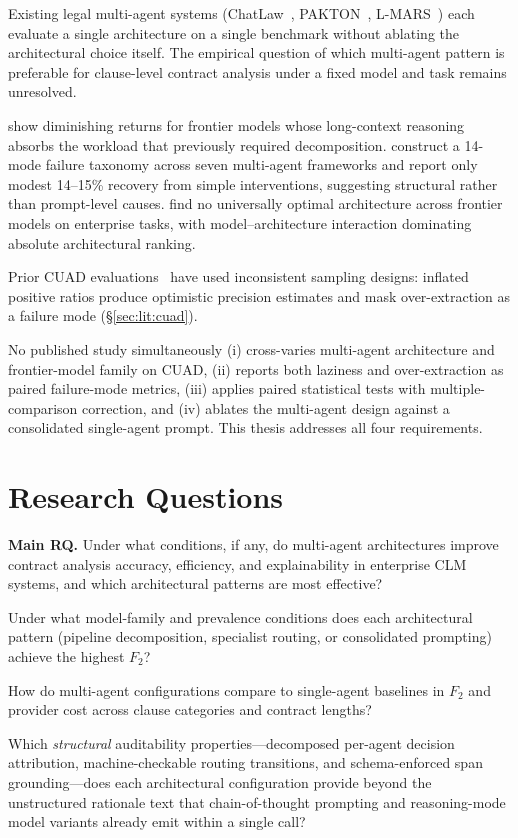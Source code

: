 Existing legal multi-agent systems (ChatLaw~\cite{cui2024chatlaw},
PAKTON~\cite{raptopoulos2025pakton}, L-MARS~\cite{wang2025lmars}) each evaluate a single
architecture on a single benchmark without ablating the architectural choice itself. The
empirical question of which multi-agent pattern is preferable for clause-level contract
analysis under a fixed model and task remains unresolved.

\textcite{gao2025single} show diminishing returns for frontier
models whose long-context reasoning absorbs the workload that previously required
decomposition. \textcite{cemri2025why} construct a 14-mode failure taxonomy
across seven multi-agent frameworks and report only modest 14--15\% recovery from simple
interventions, suggesting structural rather than prompt-level causes.
\textcite{bogavelli2025agentarch} find no universally optimal architecture across frontier
models on enterprise tasks, with model--architecture interaction dominating absolute
architectural ranking.

Prior CUAD evaluations~\cite{liu2025contracteval} have used inconsistent sampling
designs: inflated positive ratios produce optimistic precision estimates and mask
over-extraction as a failure mode (§\ref{sec:lit:cuad}).

No published study simultaneously (i) cross-varies multi-agent architecture and
frontier-model family on CUAD, (ii) reports both laziness and over-extraction as
paired failure-mode metrics, (iii) applies paired statistical tests with
multiple-comparison correction, and (iv) ablates the multi-agent design against a
consolidated single-agent prompt. This thesis addresses all four requirements.

\section{Research Questions}\label{sec:rqs}

\noindent\textbf{Main RQ.} Under what conditions, if any, do multi-agent architectures
improve contract analysis accuracy, efficiency, and explainability in enterprise CLM
systems, and which architectural patterns are most effective?

\begin{description}[leftmargin=2.5em, labelwidth=2em, itemsep=2pt]
  \item[\textbf{RQ1.}] Under what model-family and prevalence conditions does each
    architectural pattern (pipeline decomposition, specialist routing, or consolidated
    prompting) achieve the highest $F_2$?
  \item[\textbf{RQ2.}] How do multi-agent configurations compare to single-agent baselines
    in $F_2$ and provider cost across clause categories and contract lengths?
  \item[\textbf{RQ3.}] Which \emph{structural} auditability properties---decomposed
    per-agent decision attribution, machine-checkable routing transitions, and
    schema-enforced span grounding---does each architectural configuration provide
    beyond the unstructured rationale text that chain-of-thought prompting and
    reasoning-mode model variants already emit within a single call?
\end{description}

